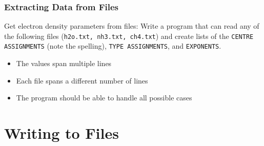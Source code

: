 \documentclass{beamer}
\newcommand{\code}[1]{\texttt{#1}}
\begin{document}
\begin{frame}	
	\frametitle{Extracting Data from Files}
	
	\begin{exampleblock}{Get electron density parameters from files:}
		Write a program that can read any of the following files (\code{h2o.txt, nh3.txt, ch4.txt}) and create lists of the \code{CENTRE ASSIGNMENTS} (note the spelling), \code{TYPE ASSIGNMENTS}, and \code{EXPONENTS}.
		\begin{itemize}
			\item The values span multiple lines
			\item Each file spans a different number of lines
			\item The program should be able to handle all possible cases
		\end{itemize}		
	\end{exampleblock}
	
\end{frame}


\section{Writing to Files}

\begin{frame}	
\end{frame}
\end{document}
